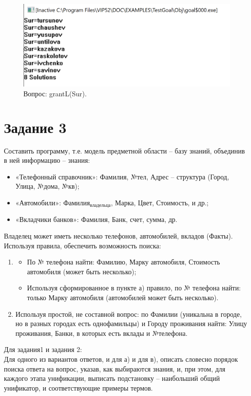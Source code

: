 \documentclass[a4paper, 12pt]{article}
\begin{document}
\begin{figure}[h!]
	\centering \includegraphics[scale=1]{2.3}
	\centering\caption{Вопрос: grantL(Sur).}
\end{figure}

\section*{Задание 3}
Составить программу, т.е. модель предметной области – базу знаний, объединив в ней информацию – знания:
\begin{itemize}
	\item «Телефонный справочник»: Фамилия, №тел, Адрес – структура (Город, Улица, №дома, №кв);
	\item «Автомобили»: $Фамилия_{владельца}$, Марка, Цвет, Стоимость, и др.;
	\item «Вкладчики банков»: Фамилия, Банк, счет, сумма, др.
\end{itemize}	
Владелец может иметь несколько телефонов, автомобилей, вкладов (Факты).
Используя правила, обеспечить возможность поиска:
\begin{enumerate}
	\item \begin{itemize}
		\item По № телефона найти: Фамилию, Марку автомобиля, Стоимость автомобиля (может быть несколько);
		\item Используя сформированное в пункте а) правило, по № телефона найти: только Марку автомобиля (автомобилей может быть несколько).
	\end{itemize}
	\item Используя простой, не составной вопрос: по Фамилии (уникальна в городе, но в разных городах есть однофамильцы) и Городу проживания найти:  Улицу проживания, Банки, в которых есть вклады и №телефона.
\end{enumerate}
Для задания1 и задания 2:
\\ \hspace*{5mm} Для одного из вариантов ответов, и для а) и для в), описать словесно порядок поиска ответа на вопрос, указав, как выбираются знания, и, при этом, для каждого этапа унификации, выписать подстановку – наибольший общий унификатор, и соответствующие примеры термов.
\end{document}
